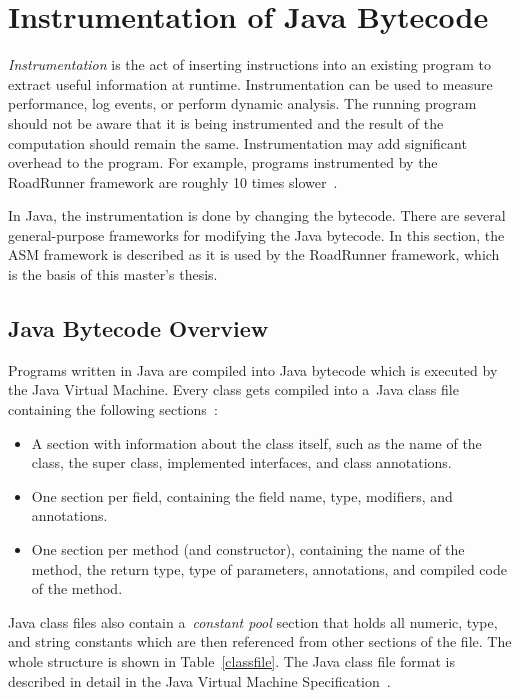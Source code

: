 \section{Instrumentation of Java Bytecode}

\emph{Instrumentation} is the act of inserting instructions into an existing
program to extract useful information at runtime. Instrumentation can be used to
measure performance, log events, or perform dynamic analysis. The running
program should not be aware that it is being instrumented and the result of the
computation should remain the same. Instrumentation may add significant overhead
to the program. For example, programs instrumented by the RoadRunner framework
are roughly 10 times slower~\cite{RoadRunner}.

In Java, the instrumentation is done by changing the bytecode. There are several
general-purpose frameworks for modifying the Java bytecode. In this section, the
ASM framework is described as it is used by the RoadRunner framework, which is
the basis of this master's thesis.

\subsection{Java Bytecode Overview}

Programs written in Java are compiled into Java bytecode which is executed by
the Java Virtual Machine. Every class gets compiled into a~Java class file
containing the following sections~\cite{asmguide}:
\begin{itemize}
    \item A section with information about the class itself, such as the name of
    the class, the super class, implemented interfaces, and class annotations.
    \item One section per field, containing the field name, type, modifiers, and
    annotations.
    \item One section per method (and constructor), containing the name of the
    method, the return type, type of parameters, annotations, and compiled code
    of the method.
\end{itemize}

Java class files also contain a~\emph{constant pool} section that holds all
numeric, type, and string constants which are then referenced from other
sections of the file. The whole structure is shown in Table~\ref{classfile}.
The Java class file format is described in detail in the Java Virtual Machine
Specification~\cite{jvmspec}.

